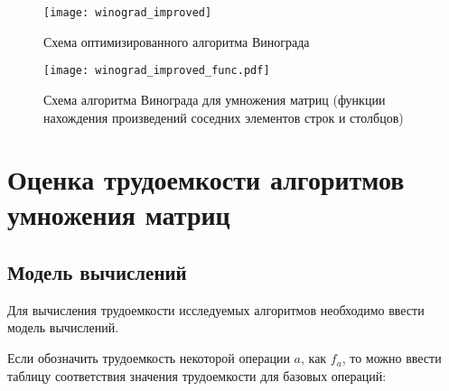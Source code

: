 \begin{figure}[h!]
    \centering
    \texttt{[image: winograd\_improved]}
    \caption{Схема оптимизированного алгоритма Винограда}
    \label{img:winograd_improved_alg}
\end{figure}

\newpage

\begin{figure}[h!]
    \centering
    \texttt{[image: winograd\_improved\_func.pdf]}
    \caption{Схема алгоритма Винограда для умножения матриц (функции нахождения произведений соседних элементов строк и столбцов)}
    \label{img:winograd_improved_func_alg}
\end{figure}

\newpage

\section{Оценка трудоемкости алгоритмов умножения матриц}

\subsection{Модель вычислений}
Для вычисления трудоемкости исследуемых алгоритмов необходимо ввести модель вычислений. 

Если обозначить трудоемкость некоторой операции $a$, как $f_a$, то можно ввести таблицу соответствия значения трудоемкости для базовых операций:


